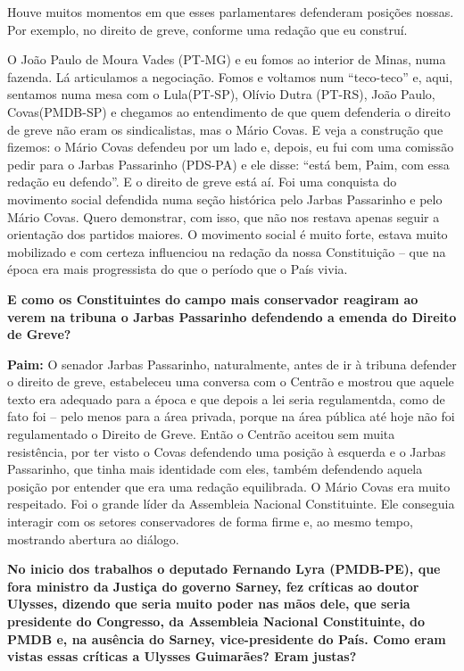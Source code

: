 Houve muitos momentos em que esses parlamentares defenderam posições
nossas. Por exemplo, no direito de greve, conforme uma redação que eu
construí.

O João Paulo de Moura Vades (PT-MG) e eu fomos ao interior de Minas,
numa fazenda. Lá articulamos a negociação. Fomos e voltamos num
``teco-teco'' e, aqui, sentamos numa mesa com o Lula(PT-SP), Olívio
Dutra (PT-RS), João Paulo, Covas(PMDB-SP) e chegamos ao entendimento de
que quem defenderia o direito de greve não eram os sindicalistas, mas o
Mário Covas. E veja a construção que fizemos: o Mário Covas defendeu por
um lado e, depois, eu fui com uma comissão pedir para o Jarbas
Passarinho (PDS-PA) e ele disse: ``está bem, Paim, com essa redação eu
defendo''. E o direito de greve está aí. Foi uma conquista do movimento
social defendida numa seção histórica pelo Jarbas Passarinho e pelo
Mário Covas. Quero demonstrar, com isso, que não nos restava apenas
seguir a orientação dos partidos maiores. O movimento social é muito
forte, estava muito mobilizado e com certeza influenciou na redação da
nossa Constituição -- que na época era mais progressista do que o
período que o País vivia.

\textbf{E como os Constituintes do campo mais conservador reagiram ao
verem na tribuna o Jarbas Passarinho defendendo a emenda do Direito de
Greve?}

\textbf{Paim:} O senador Jarbas Passarinho, naturalmente, antes de ir à
tribuna defender o direito de greve, estabeleceu uma conversa com o
Centrão e mostrou que aquele texto era adequado para a época e que
depois a lei seria regulamentda, como de fato foi -- pelo menos para a
área privada, porque na área pública até hoje não foi regulamentado o
Direito de Greve. Então o Centrão aceitou sem muita resistência, por ter
visto o Covas defendendo uma posição à esquerda e o Jarbas Passarinho,
que tinha mais identidade com eles, também defendendo aquela posição por
entender que era uma redação equilibrada. O Mário Covas era muito
respeitado. Foi o grande líder da Assembleia Nacional Constituinte. Ele
conseguia interagir com os setores conservadores de forma firme e, ao
mesmo tempo, mostrando abertura ao diálogo.

\textbf{No inicio dos trabalhos o deputado Fernando Lyra (PMDB-PE), que
fora ministro da Justiça do governo Sarney, fez críticas ao doutor
Ulysses, dizendo que seria muito poder nas mãos dele, que seria
presidente do Congresso, da Assembleia Nacional Constituinte, do PMDB e,
na ausência do Sarney, vice-presidente do País. Como eram vistas essas
críticas a Ulysses Guimarães? Eram justas?}


